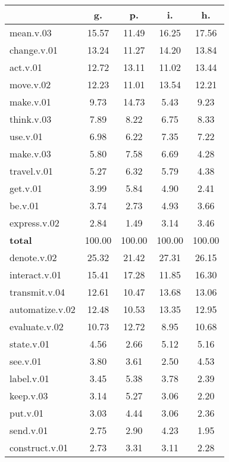 \begin{table}[h!]
\begin{center}
\begin{tabular}{| l || c | c | c | c |}\hline
 & {\bf g.} & {\bf p.} & {\bf i.} & {\bf h.} \\\hline\hline
mean.v.03 & 15.57  & 11.49  & 16.25  & 17.56 \\\hline
change.v.01 & 13.24  & 11.27  & 14.20  & 13.84 \\\hline
act.v.01 & 12.72  & 13.11  & 11.02  & 13.44 \\\hline
move.v.02 & 12.23  & 11.01  & 13.54  & 12.21 \\\hline
make.v.01 & 9.73  & 14.73  & 5.43  & 9.23 \\\hline
think.v.03 & 7.89  & 8.22  & 6.75  & 8.33 \\\hline
use.v.01 & 6.98  & 6.22  & 7.35  & 7.22 \\\hline
make.v.03 & 5.80  & 7.58  & 6.69  & 4.28 \\\hline
travel.v.01 & 5.27  & 6.32  & 5.79  & 4.38 \\\hline
get.v.01 & 3.99  & 5.84  & 4.90  & 2.41 \\\hline
be.v.01 & 3.74  & 2.73  & 4.93  & 3.66 \\\hline
express.v.02 & 2.84  & 1.49  & 3.14  & 3.46 \\\hline\hline
{{\bf total}} & 100.00  & 100.00  & 100.00  & 100.00 \\\hline\hline\hline
denote.v.02 & 25.32  & 21.42  & 27.31  & 26.15 \\\hline
interact.v.01 & 15.41  & 17.28  & 11.85  & 16.30 \\\hline
transmit.v.04 & 12.61  & 10.47  & 13.68  & 13.06 \\\hline
automatize.v.02 & 12.48  & 10.53  & 13.35  & 12.95 \\\hline
evaluate.v.02 & 10.73  & 12.72  & 8.95  & 10.68 \\\hline
state.v.01 & 4.56  & 2.66  & 5.12  & 5.16 \\\hline
see.v.01 & 3.80  & 3.61  & 2.50  & 4.53 \\\hline
label.v.01 & 3.45  & 5.38  & 3.78  & 2.39 \\\hline
keep.v.03 & 3.14  & 5.27  & 3.06  & 2.20 \\\hline
put.v.01 & 3.03  & 4.44  & 3.06  & 2.36 \\\hline
send.v.01 & 2.75  & 2.90  & 4.23  & 1.95 \\\hline
construct.v.01 & 2.73  & 3.31  & 3.11  & 2.28 \\\hline\hline

\end{tabular}
\end{center}
\end{table}
